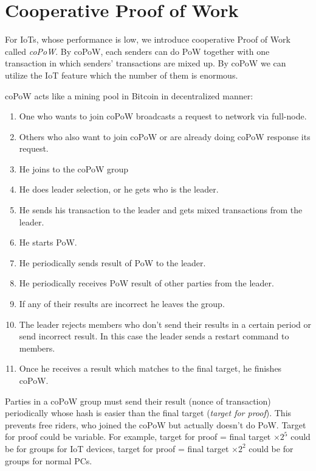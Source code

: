 \documentclass[a4paper,10pt,twocolumn]{article}
\begin{document}
\section{Cooperative Proof of Work}
\label{sec:copow}

For IoTs, whose performance is low, we introduce cooperative Proof of Work called \emph{coPoW}.
By coPoW, each senders can do PoW together with one transaction in which  senders' transactions are mixed up.
By coPoW we can utilize the IoT feature which the number of them is enormous.

coPoW acts like a mining pool in Bitcoin in decentralized manner:

\vspace{-0.5\baselineskip}
\begin{enumerate}
	\setlength\itemsep{0em}
	\item One who wants to join coPoW broadcasts a request to network via full-node.
	\item Others who also want to join coPoW or are already doing coPoW response its request.
	\item He joins to the coPoW group
	\item He does leader selection, or he gets who is the leader.
	\item He sends his transaction to the leader and gets mixed transactions from the leader.
	\item He starts PoW.
	\item He periodically sends result of PoW to the leader.
	\item He periodically receives PoW result of other parties from the leader. 
	\item If any of their results are incorrect he leaves the group.
	\item The leader rejects members who don't send their results in a certain period or send incorrect result. In this case the leader
	sends a restart command to members.
	\item Once he receives a result which matches to the final target, he finishes coPoW.
\end{enumerate}

Parties in a coPoW group must send their result (nonce of transaction) periodically whose hash 
is easier than the final target (\emph{target for proof}). This prevents free riders, who joined the coPoW but actually doesn't do PoW.
Target for proof could be variable. For example, target for proof = final target \(  \times 2^5 \) could be for groups for IoT devices,
target for proof = final target  \( \times 2^2 \) could be for groups for normal PCs.
\end{document}
